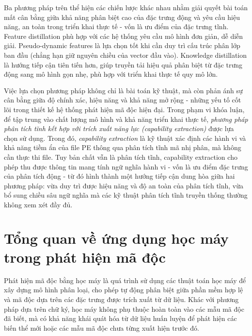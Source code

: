 Ba phương pháp trên thể hiện các chiến lược khác nhau nhằm giải quyết
bài toán mất cân bằng giữa khả năng phân biệt cao của đặc trưng động
và yêu cầu hiệu năng, an toàn trong triển khai thực tế - vốn là ưu
điểm của đặc trưng tĩnh. Feature distillation phù hợp với các hệ thống
yêu cầu mô hình đơn giản, dễ diễn giải. Pseudo-dynamic features là lựa
chọn tốt khi cần duy trì cấu trúc phân lớp ban đầu (chẳng hạn giữ
nguyên chiều của vector đầu vào). Knowledge distillation là hướng tiếp
cận tiên tiến hơn, giúp truyền tải hiệu quả phân biệt từ đặc trưng
động sang mô hình gọn nhẹ, phù hợp với triển khai thực tế quy mô lớn.

Việc lựa chọn phương pháp không chỉ là bài toán kỹ thuật, mà còn phản
ánh sự cân bằng giữa độ chính xác, hiệu năng và khả năng mở rộng -
những yếu tố cốt lõi trong thiết kế hệ thống phát hiện mã độc hiện đại.
Trong phạm vi khóa luận, để tập trung vào chất lượng mô hình và khả
năng triển khai thực tế, \textit{phương pháp phân tích tĩnh
kết hợp với trích xuất năng lực (capability extraction)} được
lựa chọn sử dụng. Trong đó, \textit{capability extraction} là kỹ thuật
xác định các hành vi và khả năng tiềm ẩn của file PE thông qua phân
tích tĩnh mã nhị phân, mà không cần thực thi file. Tuy bản chất vẫn
là phân tích tĩnh, capability extraction cho phép thu được thông tin
mang tính ngữ nghĩa hành vi - vốn là ưu điểm đặc trưng của phân
tích động - từ đó hình thành một hướng tiếp cận dung hòa giữa hai phương pháp:
vừa duy trì được hiệu năng và độ an toàn của phân tích tĩnh, vừa bổ
sung chiều sâu ngữ nghĩa mà các kỹ thuật phân tích tĩnh truyền thống
thường không xem xét đầy đủ.










\section{Tổng quan về ứng dụng học máy trong phát hiện mã độc}

Phát hiện mã độc bằng học máy là quá trình sử dụng các thuật toán học
máy để xây dựng mô hình phân loại, cho phép tự động phân biệt giữa
phần mềm hợp lệ và mã độc dựa trên các đặc trưng được trích xuất từ
dữ liệu. Khác với phương pháp dựa trên chữ ký, học máy không phụ
thuộc hoàn toàn vào các mẫu mã độc đã biết, mà có khả năng khái quát
hóa từ dữ liệu huấn luyện để phát hiện các biến thể mới hoặc các mẫu
mã độc chưa từng xuất hiện trước đó.

